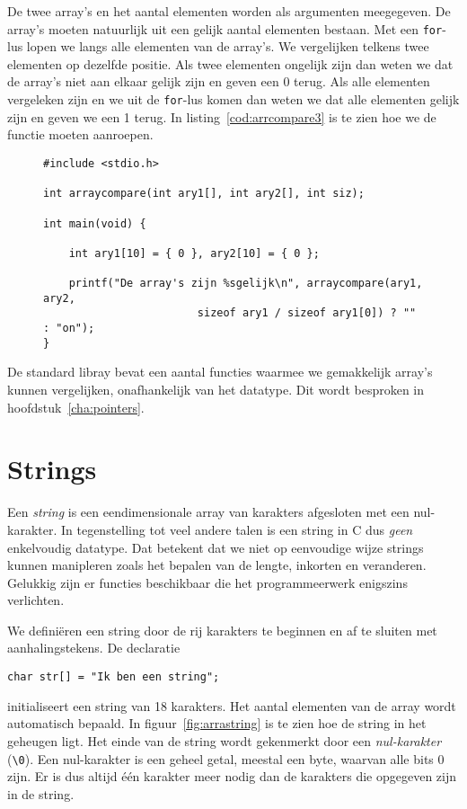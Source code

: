 De twee array's en het aantal elementen worden als argumenten meegegeven. De array's moeten natuurlijk uit een gelijk aantal elementen bestaan. Met een \texttt{for}-lus lopen we langs alle elementen van de array's. We vergelijken telkens twee elementen op dezelfde positie. Als twee elementen ongelijk zijn dan weten we dat de array's niet aan elkaar gelijk zijn en geven een 0 terug. Als alle elementen vergeleken zijn en we uit de \texttt{for}-lus komen dan weten we dat alle elementen gelijk zijn en geven we een 1 terug. In listing~\ref{cod:arrcompare3} is te zien hoe we de functie moeten aanroepen.

\begin{figure}[!ht]
\begin{lstlisting}[caption=Vergelijken van twee array's.,label=cod:arrcompare3]
#include <stdio.h>

int arraycompare(int ary1[], int ary2[], int siz);
	
int main(void) {

	int ary1[10] = { 0 }, ary2[10] = { 0 };

	printf("De array's zijn %sgelijk\n", arraycompare(ary1, ary2,
                        sizeof ary1 / sizeof ary1[0]) ? "" : "on");
}
\end{lstlisting}
\end{figure}

De standard libray bevat een aantal functies waarmee we gemakkelijk array's kunnen vergelijken, onafhankelijk van het datatype. Dit wordt besproken in hoofdstuk~\ref{cha:pointers}.

\section{Strings}
Een \textsl{string} is een eendimensionale array van karakters afgesloten met een nul-karakter. In tegenstelling tot veel andere talen is een string in C dus \textsl{geen} enkelvoudig datatype. Dat betekent dat we niet op eenvoudige wijze strings kunnen manipleren zoals het bepalen van de lengte, inkorten en veranderen. Gelukkig zijn er functies beschikbaar die het programmeerwerk enigszins verlichten. 

We definiëren een string door de rij karakters te beginnen en af te sluiten met aanhalingstekens. De declaratie

\hspace*{1em}\texttt{char str[] = "Ik ben een string";}

initialiseert een string van 18 karakters. Het aantal elementen van de array wordt automatisch bepaald.
In figuur~\ref{fig:arrastring} is te zien hoe de string in het geheugen ligt. Het einde van de string wordt gekenmerkt door een \textsl{nul-karakter} (\texttt{\textbackslash 0}). Een nul-karakter is een geheel getal, meestal een byte, waarvan alle bits 0 zijn. Er is dus altijd één karakter meer nodig dan de karakters die opgegeven zijn in de string.

